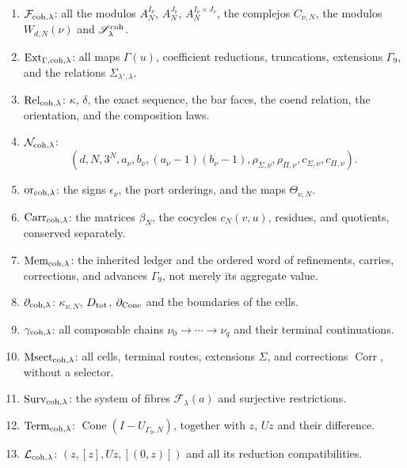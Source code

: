 \begin{enumerate}
 \item \(\mathcal F_{{\rm coh},\lambda}\): all the modulos
       \(A_N^{I_\nu}\), \(A_N^{J_\nu}\),
       \(A_N^{I_\nu\times J_\nu}\), the complejos \(C_{\nu,N}\), the
       modulos \(W_{d,N}(\nu)\) and \(\mathscr S_\lambda^{\rm coh}\).
 \item \(\operatorname{Ext}_{\Gamma,{\rm coh},\lambda}\): all maps
       \(\Gamma(u)\), coefficient reductions, truncations, extensions
       \(\Gamma_9\), and the relations \(\Sigma_{\lambda',\lambda}\).
 \item \(\operatorname{Rel}_{{\rm coh},\lambda}\):
       \(\kappa\), \(\delta\), the exact sequence, the bar faces, the
       coend relation, the orientation, and the composition laws.
 \item \(\mathcal N_{{\rm coh},\lambda}\):
       \[
       (d,N,3^N,a_\nu,b_\nu,(a_\nu-1)(b_\nu-1),
       \rho_{\Sigma,\nu},\rho_{\Pi,\nu},c_{\Sigma,\nu},c_{\Pi,\nu}).
       \]
 \item \(\operatorname{or}_{{\rm coh},\lambda}\): the signs
       \(\epsilon_\nu\), the port orderings, and the maps
       \(\Theta_{\nu,N}\).
 \item \(\operatorname{Carr}_{{\rm coh},\lambda}\): the matrices
       \(\beta_N\), the cocycles \(c_N(v,u)\), residues, and quotients,
       conserved separately.
 \item \(\operatorname{Mem}_{{\rm coh},\lambda}\): the inherited ledger and the
       ordered word of refinements, carries, corrections, and advances
       \(\Gamma_9\), not merely its aggregate value.
 \item \(\partial_{{\rm coh},\lambda}\):
       \(\kappa_{\nu,N}\), \(D_{\rm tot}\),
       \(\partial_{\rm Cone}\) and the boundaries of the cells.
 \item \(\gamma_{{\rm coh},\lambda}\): all composable chains
       \(\nu_0\to\cdots\to\nu_q\) and their terminal continuations.
 \item \(\operatorname{Msect}_{{\rm coh},\lambda}\): all cells,
       terminal routes, extensions \(\Sigma\), and corrections
       \(\operatorname{Corr}\), without a selector.
 \item \(\operatorname{Surv}_{{\rm coh},\lambda}\): the system of fibres
       \(\mathscr F_\lambda(a)\) and surjective restrictions.
 \item \(\operatorname{Term}_{{\rm coh},\lambda}\):
       \(\operatorname{Cone}(I-U_{\Gamma_9,N})\), together with \(z\), \(Uz\)
       and their difference.
 \item \(\mathcal L_{{\rm coh},\lambda}\):
       \((z,[z],Uz,[(0,z)])\) and all its reduction compatibilities.
\end{enumerate}

